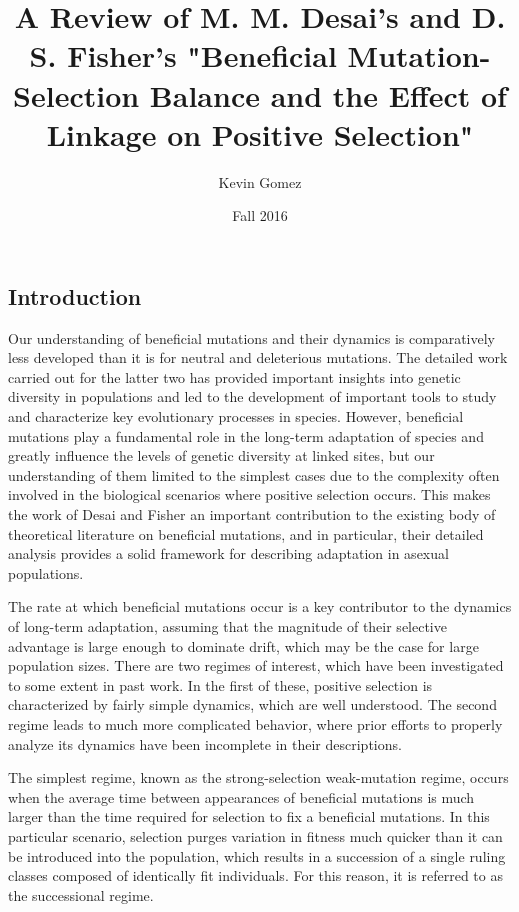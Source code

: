 \documentclass[12pt]{article}
\title{A Review of M. M. Desai's and D. S. Fisher's "Beneficial Mutation-Selection Balance and the Effect of Linkage on Positive Selection"}
\date{Fall 2016}
\author{Kevin Gomez}
\begin{document}
\maketitle
\newpage


\newpage
\subsection*{Introduction}
Our understanding of beneficial mutations and their dynamics is comparatively less developed than it is for neutral and deleterious mutations.  The detailed work carried out for the latter two has provided important insights into genetic diversity in populations and led to the development of important tools to study and characterize key evolutionary processes in species.  However, beneficial mutations play a fundamental role in the long-term adaptation of species and greatly influence the levels of genetic diversity at linked sites, but our understanding of them limited to the simplest cases due to the complexity often involved in the biological scenarios where positive selection occurs.  This makes the work of Desai and Fisher an important contribution to the existing body of theoretical literature on beneficial mutations, and in particular, their detailed analysis provides a solid framework for describing adaptation in asexual populations.  

The rate at which beneficial mutations occur is a key contributor to the dynamics of long-term adaptation, assuming that the magnitude of their selective advantage is large enough to dominate drift, which may be the case for large population sizes.  There are two regimes of interest, which have been investigated to some extent in past work.  In the first of these, positive selection is characterized by fairly simple dynamics, which are well understood.  The second regime leads to much more complicated behavior, where prior efforts to properly analyze its dynamics have been incomplete in their descriptions.        

The simplest regime, known as the strong-selection weak-mutation regime, occurs when the average time between appearances of beneficial mutations is much larger than the time required for selection to fix a beneficial mutations.  In this particular scenario, selection purges variation in fitness much quicker than it can be introduced into the population, which results in a succession of a single ruling classes composed of identically fit individuals.  For this reason, it is referred to as the successional regime.  
\end{document}
